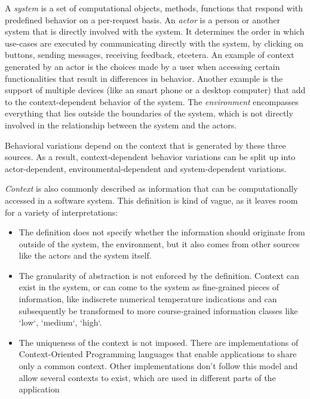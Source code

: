 \documentclass{acm_proc_article-sp}
\begin{document}
A \textit{system} is a set of computational objects, methods, functions that respond with predefined behavior on a per-request basis. An \textit{actor} is a person or another system that is directly involved with the system. It determines the order in which use-cases are executed by communicating directly with the system, by clicking on buttons, sending messages, receiving feedback, etcetera. An example of context generated by an actor is the choices made by a user when accessing certain functionalities that result in differences in behavior. Another example is the support of multiple devices (like an smart phone or a desktop computer) that add to the context-dependent behavior of the system. The \textit{environment} encompasses everything that lies outside the boundaries of the system, which is not directly involved in the relationship between the system and the actors.

Behavioral variations depend on the context that is generated by these three sources. As a result, context-dependent behavior variations can be split up into actor-dependent, environmental-dependent and  system-\linebreak dependent variations.

\textit{Context} is also commonly described as information that can be computationally accessed in a software system. This definition is kind of vague, as it leaves room for a variety of interpretations:

\begin{itemize}
\item The definition does not specify whether the information should originate from outside of the system, the environment, but it also comes from other sources like the actors and the system itself.
\item The granularity of abstraction is not enforced by the definition. Context can exist in the system, or can come to the system as fine-grained pieces of information, like indiscrete numerical temperature indications and can subsequently be transformed to more course-grained information classes like `low`, `medium`, `high`. 
\item The uniqueness of the context is not imposed. There are implementations of Context-Oriented Programming languages that enable applications to share only a common context. Other implementations don't follow this model and allow several contexts to exist, which are used in different parts of the application \cite{Appeltauer:2009:CCP:1562112.1562118}
\end{itemize}
\end{document}
